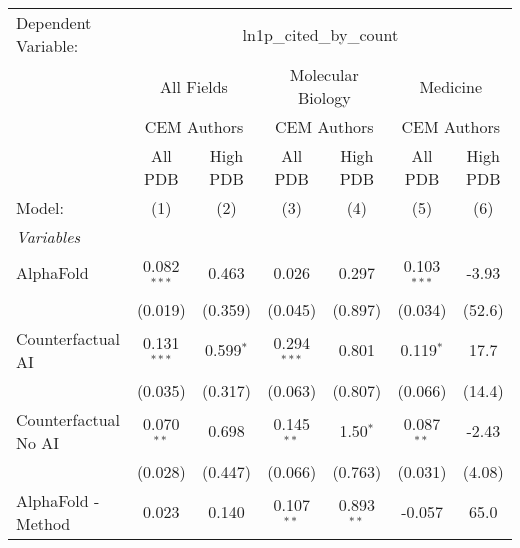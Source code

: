 \begingroup
\centering
\begin{tabular}{lcccccc}
   \tabularnewline \midrule \midrule
   Dependent Variable: & \multicolumn{6}{c}{ln1p\_cited\_by\_count}\\
 & \multicolumn{2}{c}{All Fields} & \multicolumn{2}{c}{Molecular Biology} & \multicolumn{2}{c}{Medicine} \\
\cmidrule(lr){2-3} \cmidrule(lr){4-5} \cmidrule(lr){6-7}
 & \multicolumn{2}{c}{CEM Authors} & \multicolumn{2}{c}{CEM Authors} & \multicolumn{2}{c}{CEM Authors} \\
\cmidrule(lr){2-3} \cmidrule(lr){4-5} \cmidrule(lr){6-7}
 & \multicolumn{1}{c}{All PDB} & \multicolumn{1}{c}{High PDB} & \multicolumn{1}{c}{All PDB} & \multicolumn{1}{c}{High PDB} & \multicolumn{1}{c}{All PDB} & \multicolumn{1}{c}{High PDB} \\
\cmidrule(lr){2-2} \cmidrule(lr){3-3} \cmidrule(lr){4-4} \cmidrule(lr){5-5} \cmidrule(lr){6-6} \cmidrule(lr){7-7}
   Model:                                                     & (1)           & (2)          & (3)           & (4)          & (5)           & (6)\\  
   \midrule
   \emph{Variables}\\
   AlphaFold                                                  & 0.082$^{***}$ & 0.463        & 0.026         & 0.297        & 0.103$^{***}$ & -3.93\\   
                                                              & (0.019)       & (0.359)      & (0.045)       & (0.897)      & (0.034)       & (52.6)\\   
   Counterfactual AI                                          & 0.131$^{***}$ & 0.599$^{*}$  & 0.294$^{***}$ & 0.801        & 0.119$^{*}$   & 17.7\\   
                                                              & (0.035)       & (0.317)      & (0.063)       & (0.807)      & (0.066)       & (14.4)\\   
   Counterfactual No AI                                       & 0.070$^{**}$  & 0.698        & 0.145$^{**}$  & 1.50$^{*}$   & 0.087$^{**}$  & -2.43\\   
                                                              & (0.028)       & (0.447)      & (0.066)       & (0.763)      & (0.031)       & (4.08)\\   
   AlphaFold - Method                                         & 0.023         & 0.140        & 0.107$^{**}$  & 0.893$^{**}$ & -0.057        & 65.0\\   

\end{tabular}
